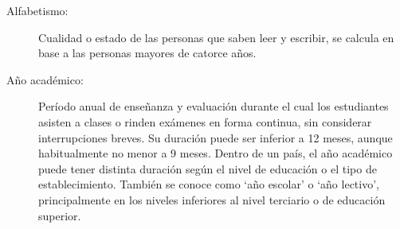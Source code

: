





\begin{description}
\item[Alfabetismo: ] Cualidad o estado de las personas que saben leer y escribir, se calcula en base a las personas mayores de catorce años.
\item[Año académico: ] Período anual de enseñanza y evaluación durante el cual los estudiantes asisten a clases o rinden exámenes en forma continua, sin considerar interrupciones breves. Su duración puede ser inferior a 12 meses, aunque habitualmente no menor a 9 meses. Dentro de un país, el año académico puede tener distinta duración según el nivel de educación o el tipo de establecimiento. También se conoce como ‘año escolar’ o ‘año lectivo’, principalmente en los niveles inferiores al nivel terciario o de educación superior.


\end{description}
